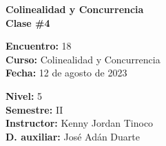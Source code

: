 \begin{center} \textbf
{
    \Large Colinealidad y Concurrencia \\ \vspace{2mm}Clase \#4
}
\end{center}

\begin{multicols}{2}
{
    \textbf{Encuentro:} 18\\
    \textbf{Curso:} Colinealidad y Concurrencia\\
    \textbf{Fecha:} 12 de agosto de 2023\\
    \begin{flushright}
        \textbf{Nivel:} 5\\
        \textbf{Semestre:} II\\
        \textbf{Instructor:} Kenny Jordan Tinoco\\
        \textbf{D. auxiliar: }José Adán Duarte
    \end{flushright}
}
\end{multicols}

\thispagestyle{first-page-style}
